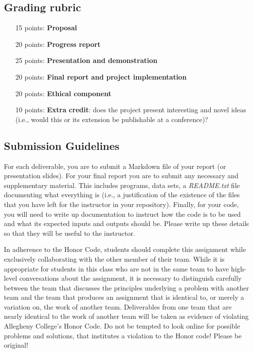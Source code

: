 \vspace*{-.1in}
\subsection*{ Grading rubric}
\vspace*{-.1in}

\begin{enumerate}  	
  	\item[15 points:] \textbf{Proposal}
  	\item[20 points:] \textbf{Progress report}
 	\item[25 points:]  \textbf{Presentation and demonstration}
 	\item[20 points:] \textbf{Final report and project implementation}
 	\item[20 points:] \textbf{Ethical component}   	
  	\item[10 points:]  \textbf{Extra credit}: does the project present interesting and novel ideas (i.e., would this or its extension be publishable at a conference)? 
\end{enumerate}

\vspace*{-.1in}
\subsection*{Submission Guidelines}
\vspace*{-.1in}

\noindent For each deliverable, you are to submit a Markdown file of your report (or presentation slides). For your final report you are to submit any necessary and supplementary material. This includes programs, data sets, a \emph{README.txt} file documenting what everything is (i.e., a justification of the existence of the files that you have left for the instructor in your repository). Finally, for your code, you will need to write up documentation to instruct how the code is to be used and what its expected inputs and outputs should be. Please write up these details so that they will be useful to the instructor.

\noindent In adherence to the Honor Code, students should complete this assignment while exclusively collaborating with the other member of their team. While it is appropriate for students in this class who are not in the same team to have high-level conversations about the assignment, it is necessary to distinguish carefully between the team that discusses the principles underlying a problem with another team and the team that produces an assignment that is identical to, or merely a variation on, the work of another team. Deliverables from one team that are nearly identical to the work of another team will be taken as evidence of violating Allegheny College's Honor Code. Do not be tempted to look online for possible problems and solutions, that institutes a violation to the Honor code! Please be original!


